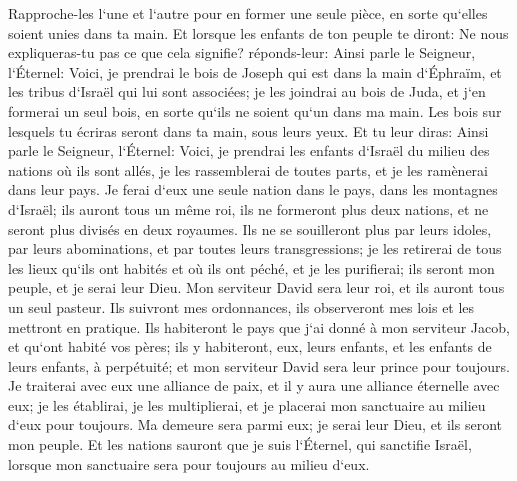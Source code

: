 \verse Rapproche-les l`une et l`autre pour en former une seule pièce, en sorte qu`elles soient unies dans ta main. 
\verse Et lorsque les enfants de ton peuple te diront: Ne nous expliqueras-tu pas ce que cela signifie? 
\verse réponds-leur: Ainsi parle le Seigneur, l`Éternel: Voici, je prendrai le bois de Joseph qui est dans la main d`Éphraïm, et les tribus d`Israël qui lui sont associées; je les joindrai au bois de Juda, et j`en formerai un seul bois, en sorte qu`ils ne soient qu`un dans ma main. 
\verse Les bois sur lesquels tu écriras seront dans ta main, sous leurs yeux. 
\verse Et tu leur diras: Ainsi parle le Seigneur, l`Éternel: Voici, je prendrai les enfants d`Israël du milieu des nations où ils sont allés, je les rassemblerai de toutes parts, et je les ramènerai dans leur pays. 
\verse Je ferai d`eux une seule nation dans le pays, dans les montagnes d`Israël; ils auront tous un même roi, ils ne formeront plus deux nations, et ne seront plus divisés en deux royaumes. 
\verse Ils ne se souilleront plus par leurs idoles, par leurs abominations, et par toutes leurs transgressions; je les retirerai de tous les lieux qu`ils ont habités et où ils ont péché, et je les purifierai; ils seront mon peuple, et je serai leur Dieu. 
\verse Mon serviteur David sera leur roi, et ils auront tous un seul pasteur. Ils suivront mes ordonnances, ils observeront mes lois et les mettront en pratique. 
\verse Ils habiteront le pays que j`ai donné à mon serviteur Jacob, et qu`ont habité vos pères; ils y habiteront, eux, leurs enfants, et les enfants de leurs enfants, à perpétuité; et mon serviteur David sera leur prince pour toujours. 
\verse Je traiterai avec eux une alliance de paix, et il y aura une alliance éternelle avec eux; je les établirai, je les multiplierai, et je placerai mon sanctuaire au milieu d`eux pour toujours. 
\verse Ma demeure sera parmi eux; je serai leur Dieu, et ils seront mon peuple. 
\verse Et les nations sauront que je suis l`Éternel, qui sanctifie Israël, lorsque mon sanctuaire sera pour toujours au milieu d`eux. 

